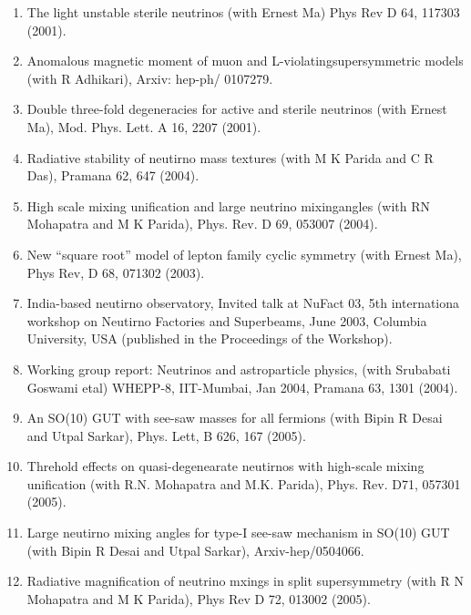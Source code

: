 \begin{enumerate}
\item The light unstable sterile neutrinos (with Ernest Ma) Phys Rev D 64, 117303 (2001).

\item Anomalous magnetic moment of muon and L-violating\break supersymmetric models (with R Adhikari), Arxiv: hep-ph/ 0107279.

\item Double three-fold degeneracies for active and sterile neutrinos (with Ernest Ma), Mod. Phys. Lett. A 16, 2207 (2001).

\item Radiative stability of neutirno mass textures (with M K Parida and C R Das), Pramana 62, 647 (2004).

\item High scale mixing unification and large neutrino mixing\break angles (with RN Mohapatra and M K Parida), Phys. Rev. D 69, 053007 (2004).

\item New ``square root'' model of lepton family cyclic symmetry (with Ernest Ma), Phys Rev, D 68, 071302 (2003).

\item India-based neutirno observatory, Invited talk at NuFact 03, 5th internationa workshop on Neutirno Factories and Superbeams, June 2003, Columbia University, USA (published in the Proceedings of the Workshop).

\item Working group report: Neutrinos and astroparticle physics, (with Srubabati Goswami etal) WHEPP-8, IIT-Mumbai, Jan 2004, Pramana 63, 1301 (2004).

\item An SO(10) GUT with see-saw masses for all fermions (with Bipin R Desai and Utpal Sarkar), Phys. Lett, B 626, 167 (2005).

\item Threhold effects on quasi-degenearate neutirnos with high-scale mixing unification (with R.N. Mohapatra and M.K. Parida), Phys. Rev. D71, 057301 (2005).

\item Large neutirno mixing angles for type-I see-saw mechanism in SO(10) GUT (with Bipin R Desai and Utpal Sarkar), Arxiv-hep/0504066.

\item Radiative magnification of neutrino mxings in split supersymmetry (with R N Mohapatra and M K Parida), Phys Rev D 72, 013002 (2005).


\end{enumerate}
